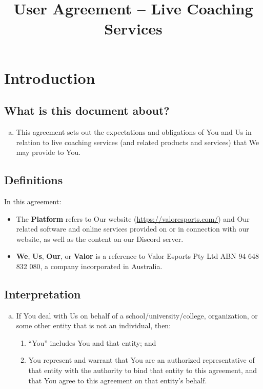 \documentclass[10pt]{article}
\begin{document}
\title{User Agreement -- Live Coaching Services}

\section{Introduction}

\subsection{What is this document about?}
\begin{enumerate}[(a)]
\item
This agreement sets out the expectations and obligations of You and Us in relation to live coaching services (and related products and services) that We may provide to You.
\end{enumerate}

\subsection{Definitions}
In this agreement:

\begin{itemize}[label={}]
\item
The \textbf{Platform} refers to Our website (\url{https://valoresports.com/}) and Our related software and online services provided on or in connection with our website, as well as the content on our Discord server.

\item
\textbf{We}, \textbf{Us}, \textbf{Our}, or \textbf{Valor} is a reference to Valor Esports Pty Ltd ABN 94 648 832 080, a company incorporated in Australia.
\end{itemize}

\subsection{Interpretation}
\begin{enumerate}[(a)]
\item
If You deal with Us on behalf of a school/university/college, organization, or some other entity that is not an individual, then:
\begin{enumerate}[(1)]
\item
``You'' includes You and that entity; and

\item
You represent and warrant that You are an authorized representative of that entity with the authority to bind that entity to this agreement, and that You agree to this agreement on that entity’s behalf.
\end{enumerate}
\end{enumerate}
\end{document}
